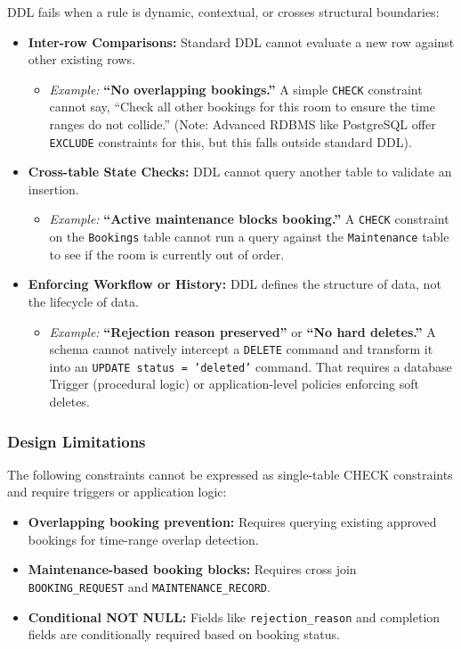 DDL fails when a rule is dynamic, contextual, or crosses structural boundaries:
\begin{itemize}
	\item \textbf{Inter-row Comparisons:} Standard DDL cannot evaluate a new row against other existing rows.
	      \begin{itemize}
		      \item \textit{Example:} \textbf{``No overlapping bookings.''} A simple \texttt{CHECK} constraint cannot say, ``Check all other bookings for this room to ensure the time ranges do not collide.'' (Note: Advanced RDBMS like PostgreSQL offer \texttt{EXCLUDE} constraints for this, but this falls outside standard DDL).
	      \end{itemize}
	\item \textbf{Cross-table State Checks:} DDL cannot query another table to validate an insertion.
	      \begin{itemize}
		      \item \textit{Example:} \textbf{``Active maintenance blocks booking.''} A \texttt{CHECK} constraint on the \texttt{Bookings} table cannot run a query against the \texttt{Maintenance} table to see if the room is currently out of order.
	      \end{itemize}
	\item \textbf{Enforcing Workflow or History:} DDL defines the structure of data, not the lifecycle of data.
	      \begin{itemize}
		      \item \textit{Example:} \textbf{``Rejection reason preserved''} or \textbf{``No hard deletes.''} A schema cannot natively intercept a \texttt{DELETE} command and transform it into an \texttt{UPDATE status = 'deleted'} command. That requires a database Trigger (procedural logic) or application-level policies enforcing soft deletes.
	      \end{itemize}
\end{itemize}

\subsubsection{Design Limitations}

The following constraints cannot be expressed as single-table CHECK constraints and require triggers or application logic:

\begin{itemize}
	\item \textbf{Overlapping booking prevention:} Requires querying existing approved bookings for time-range overlap detection.
	\item \textbf{Maintenance-based booking blocks:} Requires cross join \texttt{BOOKING\_REQUEST} and \texttt{MAINTENANCE\_RECORD}.
	\item \textbf{Conditional NOT NULL:} Fields like \texttt{rejection\_reason} and completion fields are conditionally required based on booking status.
\end{itemize}